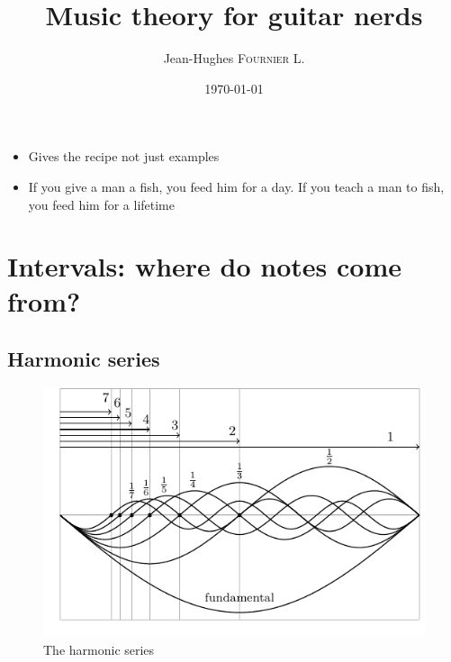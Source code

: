 \documentclass{article}
\title{ Music theory for guitar nerds  } %
\author{ Jean-Hughes \textsc{Fournier L.} } %
\date{\today} %
\begin{document}
\maketitle %
\newpage
\tableofcontents
\newpage

\begin{itemize}
	\item Gives the recipe not just examples
	\item If you give a man a fish, you feed him for a day. If you teach a man to fish, you feed him for a lifetime
\end{itemize}

\section{Intervals: where do notes come from?}


\subsection{Harmonic series}

\begin{figure}[h!]
	\centering
	\hspace*{0cm}
	\includegraphics[scale=1.0, trim= {0cm 0cm 0cm 0cm}, clip]{serie_harmonique/main.pdf}
	\caption{The harmonic series}
	\label{fig}
\end{figure} 
\end{document}
